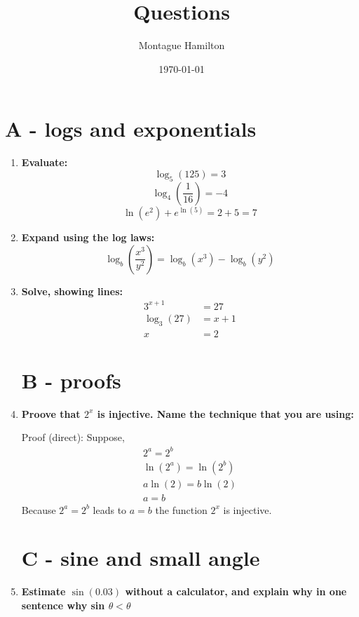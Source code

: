 \documentclass{article}
\begin{document}
\title{Questions}
\author{Montague Hamilton}
\date{\today}
\maketitle

\section{A - logs and exponentials}
\begin{enumerate}[itemsep=12pt]
  \item \textbf{Evaluate:} 
    \[
      \log_{5}(125) = 3
    \]
    \[
      \log_{4}(\frac{1}{16}) = -4
    \]
    \[
      \ln(e^{2}) + e^{\ln(5)} = 2 + 5 = 7
    \]
    
  \item \textbf{Expand using the log laws:}
    \[
      \log_{b}(\frac{x^{3}}{y^{2}}) = \log_{b}(x^{3}) - \log_{b}(y^{2})
    \]
    
  \item \textbf{Solve, showing lines:} 
    \begin{align*}
      3^{x+1} &= 27 \\
      \log_{3}(27) &= x + 1 \\
      x &= 2
    \end{align*}

  \section{B - proofs}
  \item \textbf{Proove that $2^{x}$ is injective. Name the technique that you are using:} 

    Proof (direct):
    Suppose,
    \begin{gather*}
      2^{a} = 2^{b} \\
      \ln(2^{a}) = \ln(2^{b}) \\
      a \ln(2) = b \ln(2) \\
      a = b
    \end{gather*}
    Because $2^{a} = 2^{b}$ leads to $a = b$ the function $2^{x}$ is injective.

  \section{C - sine and small angle}
  \item \textbf{Estimate $\sin(0.03)$ without a calculator, and explain why in one sentence why sin $\theta < \theta$}


\end{enumerate}
\end{document}
